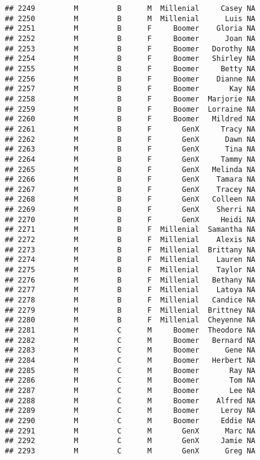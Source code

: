 \documentclass[
]{article}
\begin{document}
\begin{verbatim}
## 2249         M         B      M  Millenial     Casey NA
## 2250         M         B      M  Millenial      Luis NA
## 2251         M         B      F     Boomer    Gloria NA
## 2252         M         B      F     Boomer      Joan NA
## 2253         M         B      F     Boomer   Dorothy NA
## 2254         M         B      F     Boomer   Shirley NA
## 2255         M         B      F     Boomer     Betty NA
## 2256         M         B      F     Boomer    Dianne NA
## 2257         M         B      F     Boomer       Kay NA
## 2258         M         B      F     Boomer  Marjorie NA
## 2259         M         B      F     Boomer  Lorraine NA
## 2260         M         B      F     Boomer   Mildred NA
## 2261         M         B      F       GenX     Tracy NA
## 2262         M         B      F       GenX      Dawn NA
## 2263         M         B      F       GenX      Tina NA
## 2264         M         B      F       GenX     Tammy NA
## 2265         M         B      F       GenX   Melinda NA
## 2266         M         B      F       GenX    Tamara NA
## 2267         M         B      F       GenX    Tracey NA
## 2268         M         B      F       GenX   Colleen NA
## 2269         M         B      F       GenX    Sherri NA
## 2270         M         B      F       GenX     Heidi NA
## 2271         M         B      F  Millenial  Samantha NA
## 2272         M         B      F  Millenial    Alexis NA
## 2273         M         B      F  Millenial  Brittany NA
## 2274         M         B      F  Millenial    Lauren NA
## 2275         M         B      F  Millenial    Taylor NA
## 2276         M         B      F  Millenial   Bethany NA
## 2277         M         B      F  Millenial    Latoya NA
## 2278         M         B      F  Millenial   Candice NA
## 2279         M         B      F  Millenial  Brittney NA
## 2280         M         B      F  Millenial  Cheyenne NA
## 2281         M         C      M     Boomer  Theodore NA
## 2282         M         C      M     Boomer   Bernard NA
## 2283         M         C      M     Boomer      Gene NA
## 2284         M         C      M     Boomer   Herbert NA
## 2285         M         C      M     Boomer       Ray NA
## 2286         M         C      M     Boomer       Tom NA
## 2287         M         C      M     Boomer       Lee NA
## 2288         M         C      M     Boomer    Alfred NA
## 2289         M         C      M     Boomer     Leroy NA
## 2290         M         C      M     Boomer     Eddie NA
## 2291         M         C      M       GenX      Marc NA
## 2292         M         C      M       GenX     Jamie NA
## 2293         M         C      M       GenX      Greg NA

\end{verbatim}
\end{document}
